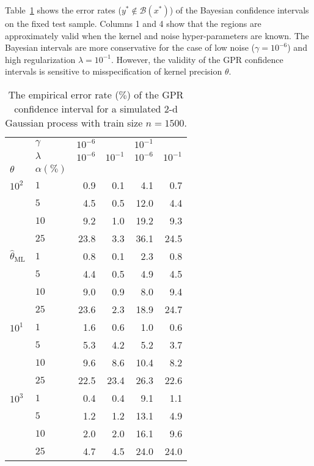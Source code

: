 \documentclass[10pt, conference, compsocconf]{IEEEtran}
\newcommand{\Bcal}{\mathcal{B}}
\begin{document}
Table~\ref{tab:gaussian_2d_cov_gpr} shows the error rates ($y^*\notin\Bcal(x^*)$)
of the Bayesian confidence intervals on the fixed test sample. Columns 1 and 4 show
that the regions are approximately valid when the kernel and noise hyper-parameters
are known. The Bayesian intervals are more conservative for the case of low noise
($\gamma=10^{-6}$) and high regularization $\lambda=10^{-1}$. However, the validity
of the GPR confidence intervals is sensitive to misspecification of kernel precision
$\theta$.
\begin{table}
\centering
  \caption{The empirical error rate ($\%$) of the GPR confidence interval for a
  simulated $2$-d Gaussian process with train size $n=1500$.}
  \label{tab:gaussian_2d_cov_gpr}
  \begin{tabular}{ll||rr|rr}
  \toprule
       & $\gamma$ & $10^{-6}$ &          & $10^{-1}$ &          \\\cline{2-2}
       & $\lambda$ & $10^{-6}$ & $10^{-1}$ & $10^{-6}$ & $10^{-1}$ \\\cline{2-2}
  $\theta$ & $\alpha(\%)$ &          &          &          &          \\
  \midrule
  $10^2$ & $1$ &     0.9 &     0.1 &     4.1 &     0.7 \\
       & $5$ &     4.5 &     0.5 &    12.0 &     4.4 \\
       & $10$ &     9.2 &     1.0 &    19.2 &     9.3 \\
       & $25$ &    23.8 &     3.3 &    36.1 &    24.5 \\
  \midrule
  $\hat{\theta}_\text{ML}$ & $1$ &     0.8 &     0.1 &     2.3 &     0.8 \\
       & $5$ &     4.4 &     0.5 &     4.9 &     4.5 \\
       & $10$ &     9.0 &     0.9 &     8.0 &     9.4 \\
       & $25$ &    23.6 &     2.3 &    18.9 &    24.7 \\
  \midrule
  $10^1$ & $1$ &      1.6 &      0.6 &      1.0 &      0.6 \\
       & $5$ &      5.3 &      4.2 &      5.2 &      3.7 \\
       & $10$ &      9.6 &      8.6 &     10.4 &      8.2 \\
       & $25$ &     22.5 &     23.4 &     26.3 &     22.6 \\
  \midrule
  $10^3$ & $1$ &      0.4 &      0.4 &      9.1 &      1.1 \\
       & $5$ &      1.2 &      1.2 &     13.1 &      4.9 \\
       & $10$ &      2.0 &      2.0 &     16.1 &      9.6 \\
       & $25$ &      4.7 &      4.5 &     24.0 &     24.0 \\
  \bottomrule
  \end{tabular}
\end{table}
\end{document}

